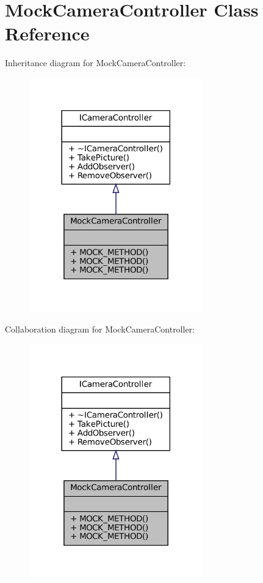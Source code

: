 \hypertarget{classMockCameraController}{}\section{Mock\+Camera\+Controller Class Reference}
\label{classMockCameraController}


Inheritance diagram for Mock\+Camera\+Controller\+:
\nopagebreak
\begin{figure}[H]
\begin{center}
\leavevmode
\includegraphics[width=213pt]{classMockCameraController__inherit__graph}
\end{center}
\end{figure}


Collaboration diagram for Mock\+Camera\+Controller\+:
\nopagebreak
\begin{figure}[H]
\begin{center}
\leavevmode
\includegraphics[width=213pt]{classMockCameraController__coll__graph}
\end{center}
\end{figure}

